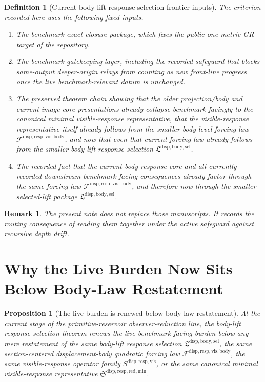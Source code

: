\documentclass[11pt]{article}
\newcommand{\LiftSelectionPackage}{\mathfrak L^{\mathrm{disp,body,sel}}}
\newcommand{\VisibleBodyForcingLaw}{\mathscr F^{\mathrm{disp,resp,vis,body}}}
\newcommand{\VisibleResponseOperator}{S^{\mathrm{disp,resp,vis}}}
\newcommand{\MinimalReducedStructure}{\mathfrak S^{\mathrm{disp,resp,red,min}}}
\newtheorem{definition}{Definition}
\newtheorem{proposition}{Proposition}
\newtheorem{remark}{Remark}
\begin{document}
\begin{definition}[Current body-lift response-selection frontier inputs]
The criterion recorded here uses the following fixed inputs.
\begin{enumerate}
    \item The benchmark exact-closure package, which fixes the public one-metric GR target of the repository.
    \item The benchmark gatekeeping layer, including the recorded safeguard that blocks same-output deeper-origin relays from counting as new front-line progress once the live benchmark-relevant datum is unchanged.
    \item The preserved theorem chain showing that the older projection/body and current-image-core presentations already collapse benchmark-facingly to the canonical minimal visible-response representative, that the visible-response representative itself already follows from the smaller body-level forcing law \(\VisibleBodyForcingLaw\), and now that even that current forcing law already follows from the smaller body-lift response selection \(\LiftSelectionPackage\).
    \item The recorded fact that the current body-response core and all currently recorded downstream benchmark-facing consequences already factor through the same forcing law \(\VisibleBodyForcingLaw\), and therefore now through the smaller selected-lift package \(\LiftSelectionPackage\).
\end{enumerate}
\end{definition}

\begin{remark}
The present note does not replace those manuscripts. It records the routing consequence of reading them together under the active safeguard against recursive depth drift.
\end{remark}

\section{Why the Live Burden Now Sits Below Body-Law Restatement}

\begin{proposition}[The live burden is renewed below body-law restatement]
At the current stage of the primitive-reservoir observer-reduction line, the body-lift response-selection theorem renews the live benchmark-facing burden below any mere restatement of the same body-lift response selection \(\LiftSelectionPackage\), the same section-centered displacement-body quadratic forcing law \(\VisibleBodyForcingLaw\), the same visible-response operator family \(\VisibleResponseOperator\), or the same canonical minimal visible-response representative \(\MinimalReducedStructure\).
\end{proposition}
\end{document}
